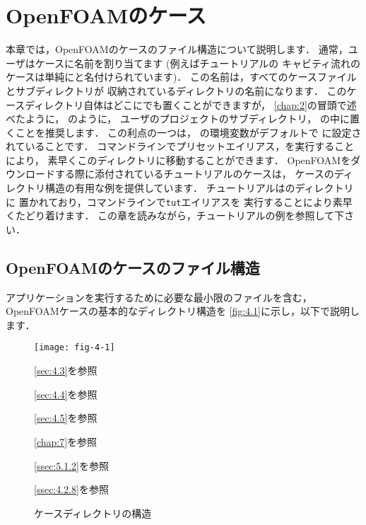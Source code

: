 \chapter{OpenFOAMのケース}
\label{chap:4}
%
%
本章では，OpenFOAMのケースのファイル構造について説明します．
通常，ユーザはケースに名前を割り当てます (例えばチュートリアルの
キャビティ流れのケースは単純にと名付けられています)．
この名前は，すべてのケースファイルとサブディレクトリが
収納されているディレクトリの名前になります．
このケースディレクトリ自体はどこにでも置くことができますが，
\autoref{chap:2}の冒頭で述べたように，
のように，
ユーザのプロジェクトのサブディレクトリ，
%
%
の中に置くことを推奨します．
この利点の一つは，
%
%
の環境変数がデフォルトで
に設定されていることです．
コマンドラインでプリセットエイリアス，を実行することにより，
素早くこのディレクトリに移動することができます．
OpenFOAMをダウンロードする際に添付されているチュートリアルのケースは，
ケースのディレクトリ構造の有用な例を提供しています．
チュートリアルはのディレクトリに
置かれており，コマンドラインで\texttt{tut}エイリアスを
実行することにより素早くたどり着けます．
この章を読みながら，チュートリアルの例を参照して下さい．



\section{OpenFOAMのケースのファイル構造}
\label{sec:4.1}
アプリケーションを実行するために必要な最小限のファイルを含む，
OpenFOAMケースの基本的なディレクトリ構造を
\autoref{fig:4.1}に示し，以下で説明します．


\begin{figure}[ht]
 \begin{minipage}{.6\textwidth}
  \texttt{[image: fig-4-1]}
  \hskip5pt
  \begin{minipage}[b]{7zw}
   \def\baselinestretch{1.2}\selectfont
   \autoref{sec:4.3}を参照\par
   \autoref{sec:4.4}を参照\par
   \autoref{sec:4.5}を参照\par
   \vskip28pt
   \autoref{chap:7}を参照\par
   \vskip4pt
   \autoref{ssec:5.1.2}を参照\par
   \vskip68pt
   \autoref{ssec:4.2.8}を参照\par
   \vskip-12pt\null
  \end{minipage}
 \end{minipage}
 \caption{ケースディレクトリの構造}
 \label{fig:4.1}
\end{figure}


